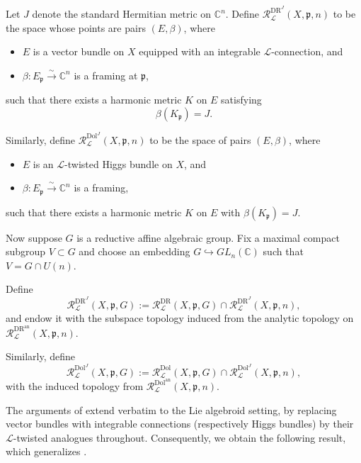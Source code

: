 \documentclass[12pt,reqno]{amsart}
\numberwithin{equation}{subsection}
\theoremstyle{definition}
\theoremstyle{theorem}
\begin{document}
Let $J$ denote the standard Hermitian metric on $\mathbb{C}^{n}$.  
Define $\mathcal{R}^{\text{DR}^{J}}_{\mathcal{L}}(X,\mathfrak{p},n)$ to be the space whose points are pairs $(E,\beta)$, where
\begin{itemize}
	\item $E$ is a vector bundle on $X$ equipped with an integrable $\mathcal{L}$-connection, and
	\item $\beta \colon E_{\mathfrak{p}} \xrightarrow{\sim} \mathbb{C}^{n}$ is a framing at $\mathfrak{p}$,
\end{itemize}
such that there exists a harmonic metric $K$ on $E$ satisfying
\[
\beta(K_{\mathfrak{p}}) = J .
\]

Similarly, define $\mathcal{R}^{\mathrm{Dol}^{J}}_{\mathcal{L}}(X,\mathfrak{p},n)$ to be the space of pairs $(E,\beta)$, where
\begin{itemize}
	\item $E$ is an $\mathcal{L}$-twisted Higgs bundle on $X$, and
	\item $\beta \colon E_{\mathfrak{p}} \xrightarrow{\sim} \mathbb{C}^{n}$ is a framing,
\end{itemize}
such that there exists a harmonic metric $K$ on $E$ with $\beta(K_{\mathfrak{p}})=J$.

Now suppose $G$ is a reductive affine algebraic group.  
Fix a maximal compact subgroup $V \subset G$ and choose an embedding $
G \hookrightarrow GL_{n}(\mathbb{C})$ such that $V = G \cap U(n)$.

Define
\[
\mathcal{R}^{\text{DR}^{J}}_{\mathcal{L}}(X,\mathfrak{p},G)
:= \mathcal{R}^{\text{DR}}_{\mathcal{L}}(X,\mathfrak{p},G)
\cap
\mathcal{R}^{\text{DR}^{J}}_{\mathcal{L}}(X,\mathfrak{p},n),
\]
and endow it with the subspace topology induced from the analytic topology on
$\mathcal{R}^{\text{DR}^{\mathrm{an}}}_{\mathcal{L}}(X,\mathfrak{p},n)$.

Similarly, define
\[
\mathcal{R}^{\mathrm{Dol}^{J}}_{\mathcal{L}}(X,\mathfrak{p},G)
:= \mathcal{R}^{\mathrm{Dol}}_{\mathcal{L}}(X,\mathfrak{p},G)
\cap
\mathcal{R}^{\mathrm{Dol}^{J}}_{\mathcal{L}}(X,\mathfrak{p},n),
\]
with the induced topology from
$\mathcal{R}^{\mathrm{Dol}^{\mathrm{an}}}_{\mathcal{L}}(X,\mathfrak{p},n)$.

The arguments of \cite[\S\,9, Lemmas~9.13 and~9.14]{CT.Simpson-1995} extend verbatim to the Lie algebroid setting, by replacing vector bundles with integrable connections (respectively Higgs bundles) by their $\mathcal{L}$-twisted analogues throughout. Consequently, we obtain the following result, which generalizes \cite[\S\,9, Lemma~9.15]{CT.Simpson-1995}.
\end{document}
